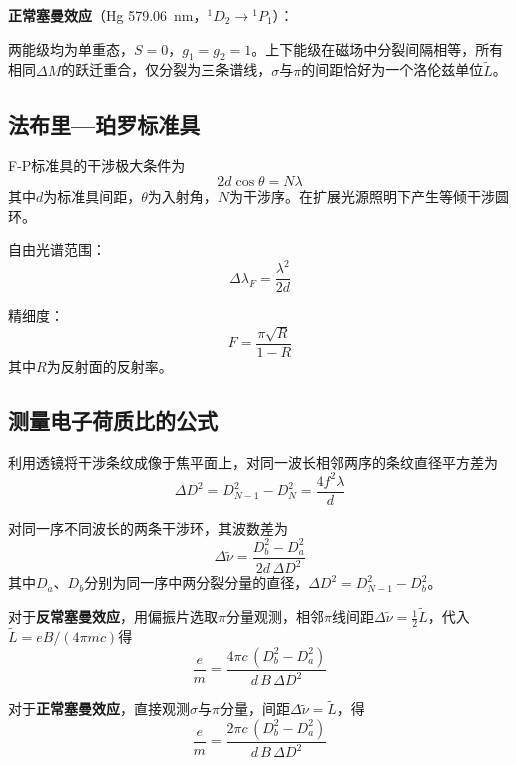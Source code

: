 \documentclass[a4paper,8pt,twocolumn]{article}
\begin{document}
\textbf{正常塞曼效应}（Hg \SI{579.06}{nm}，${}^1D_2 \to {}^1P_1$）：

两能级均为单重态，$S=0$，$g_1 = g_2 = 1$。上下能级在磁场中分裂间隔相等，所有相同$\Delta M$的跃迁重合，仅分裂为三条谱线，$\sigma$与$\pi$的间距恰好为一个洛伦兹单位$\tilde{L}$。

\subsection{法布里—珀罗标准具}

F-P标准具的干涉极大条件为
\begin{equation}
  2d\cos\theta = N\lambda
  \tag{6}
\end{equation}
其中$d$为标准具间距，$\theta$为入射角，$N$为干涉序。在扩展光源照明下产生等倾干涉圆环。

自由光谱范围：
\begin{equation}
  \Delta\lambda_F = \frac{\lambda^2}{2d}
  \tag{7}
\end{equation}

精细度：
\begin{equation}
  F = \frac{\pi\sqrt{R}}{1-R}
  \tag{8}
\end{equation}
其中$R$为反射面的反射率。

\subsection{测量电子荷质比的公式}

利用透镜将干涉条纹成像于焦平面上，对同一波长相邻两序的条纹直径平方差为
\begin{equation}
  \Delta D^2 = D_{N-1}^2 - D_N^2 = \frac{4f^2\lambda}{d}
  \tag{9}
\end{equation}

对同一序不同波长的两条干涉环，其波数差为
\begin{equation}
  \Delta\tilde{\nu} = \frac{D_b^2 - D_a^2}{2d\,\Delta D^2}
  \tag{10}
\end{equation}
其中$D_a$、$D_b$分别为同一序中两分裂分量的直径，$\Delta D^2 = D_{N-1}^2 - D_b^2$。

对于\textbf{反常塞曼效应}，用偏振片选取$\pi$分量观测，相邻$\pi$线间距$\Delta\tilde{\nu} = \frac{1}{2}\tilde{L}$，代入$\tilde{L} = eB/(4\pi mc)$得
\begin{equation}
  \frac{e}{m} = \frac{4\pi c\,(D_b^2 - D_a^2)}{d\,B\,\Delta D^2}
  \tag{11}
\end{equation}

对于\textbf{正常塞曼效应}，直接观测$\sigma$与$\pi$分量，间距$\Delta\tilde{\nu} = \tilde{L}$，得
\begin{equation}
  \frac{e}{m} = \frac{2\pi c\,(D_b^2 - D_a^2)}{d\,B\,\Delta D^2}
  \tag{12}
\end{equation}
\end{document}
